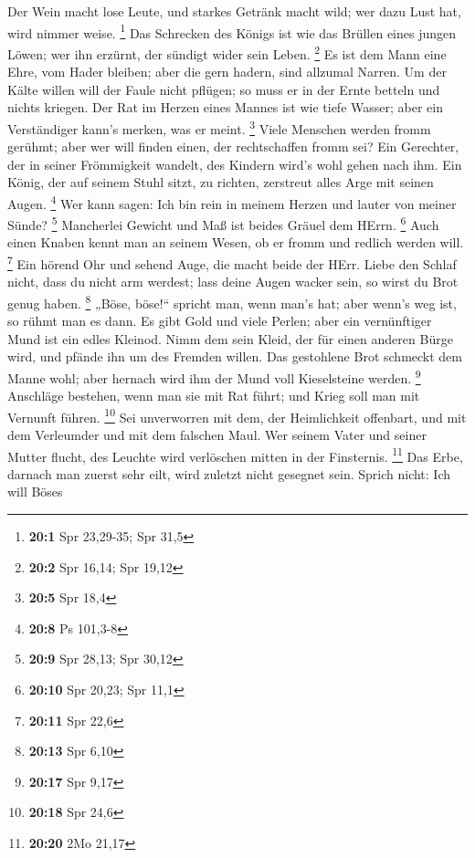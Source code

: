  Der Wein macht lose Leute, und starkes Getränk macht wild;
wer dazu Lust hat, wird nimmer weise. \footnote{\textbf{20:1} Spr
  23,29-35; Spr 31,5}  Das Schrecken des Königs ist wie das
Brüllen eines jungen Löwen; wer ihn erzürnt, der sündigt wider sein
Leben. \footnote{\textbf{20:2} Spr 16,14; Spr 19,12}  Es ist
dem Mann eine Ehre, vom Hader bleiben; aber die gern hadern, sind
allzumal Narren.  Um der Kälte willen will der Faule nicht
pflügen; so muss er in der Ernte betteln und nichts kriegen.
 Der Rat im Herzen eines Mannes ist wie tiefe Wasser; aber
ein Verständiger kann's merken, was er meint. \footnote{\textbf{20:5}
  Spr 18,4}  Viele Menschen werden fromm gerühmt; aber wer
will finden einen, der rechtschaffen fromm sei?  Ein
Gerechter, der in seiner Frömmigkeit wandelt, des Kindern wird's wohl
gehen nach ihm.  Ein König, der auf seinem Stuhl sitzt, zu
richten, zerstreut alles Arge mit seinen Augen. \footnote{\textbf{20:8}
  Ps 101,3-8}  Wer kann sagen: Ich bin rein in meinem Herzen
und lauter von meiner Sünde? \footnote{\textbf{20:9} Spr 28,13; Spr
  30,12}  Mancherlei Gewicht und Maß ist beides Gräuel dem
HErrn. \footnote{\textbf{20:10} Spr 20,23; Spr 11,1}  Auch
einen Knaben kennt man an seinem Wesen, ob er fromm und redlich werden
will. \footnote{\textbf{20:11} Spr 22,6}  Ein hörend Ohr
und sehend Auge, die macht beide der HErr.  Liebe den
Schlaf nicht, dass du nicht arm werdest; lass deine Augen wacker sein,
so wirst du Brot genug haben. \footnote{\textbf{20:13} Spr 6,10}
 „Böse, böse!{}`` spricht man, wenn man's hat; aber wenn's
weg ist, so rühmt man es dann.  Es gibt Gold und viele
Perlen; aber ein vernünftiger Mund ist ein edles Kleinod. 
Nimm dem sein Kleid, der für einen anderen Bürge wird, und pfände ihn um
des Fremden willen.  Das gestohlene Brot schmeckt dem Manne
wohl; aber hernach wird ihm der Mund voll Kieselsteine werden.
\footnote{\textbf{20:17} Spr 9,17}  Anschläge bestehen,
wenn man sie mit Rat führt; und Krieg soll man mit Vernunft führen.
\footnote{\textbf{20:18} Spr 24,6}  Sei unverworren mit
dem, der Heimlichkeit offenbart, und mit dem Verleumder und mit dem
falschen Maul.  Wer seinem Vater und seiner Mutter flucht,
des Leuchte wird verlöschen mitten in der Finsternis. \footnote{\textbf{20:20}
  2Mo 21,17}  Das Erbe, darnach man zuerst sehr eilt, wird
zuletzt nicht gesegnet sein.  Sprich nicht: Ich will Böses
